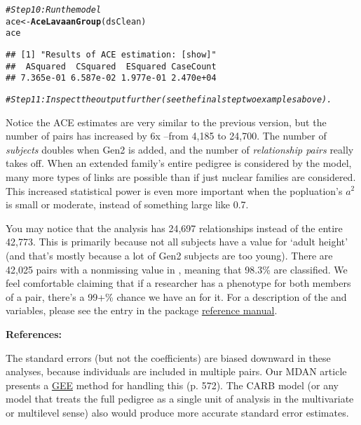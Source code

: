 \documentclass{article}\usepackage[]{graphicx}\usepackage[]{color}
\makeatletter
\newcommand{\hlcom}[1]{\textcolor[rgb]{0.678,0.584,0.686}{\textit{#1}}}%
\newcommand{\hlstd}[1]{\textcolor[rgb]{0.345,0.345,0.345}{#1}}%
\newcommand{\hlkwb}[1]{\textcolor[rgb]{0.69,0.353,0.396}{#1}}%
\newcommand{\hlkwd}[1]{\textcolor[rgb]{0.737,0.353,0.396}{\textbf{#1}}}%
\newenvironment{kframe}{%
 \def\at@end@of@kframe{}%
 \ifinner\ifhmode%
  \def\at@end@of@kframe{\end{minipage}}%
  \begin{minipage}{\columnwidth}%
 \fi\fi%
 \def\FrameCommand##1{\hskip\@totalleftmargin \hskip-\fboxsep
 \colorbox{shadecolor}{##1}\hskip-\fboxsep
     \hskip-\linewidth \hskip-\@totalleftmargin \hskip\columnwidth}%
 \MakeFramed {\advance\hsize-\width
   \@totalleftmargin\z@ \linewidth\hsize
   \@setminipage}}%
 {\par\unskip\endMakeFramed%
 \at@end@of@kframe}
\newenvironment{knitrout}{}{} %
\makeatother
\begin{document}
\begin{knitrout}
\begin{kframe}
\begin{alltt}
\hlcom{#Step 10: Run the model}
\hlstd{ace} \hlkwb{<-} \hlkwd{AceLavaanGroup}\hlstd{(dsClean)}
\hlstd{ace}
\end{alltt}
\begin{verbatim}
## [1] "Results of ACE estimation: [show]"
##  ASquared  CSquared  ESquared CaseCount 
## 7.365e-01 6.587e-02 1.977e-01 2.470e+04
\end{verbatim}
\begin{alltt}
\hlcom{#Step 11: Inspect the output further (see the final step two examples above).}
\end{alltt}
\end{kframe}
\end{knitrout}


Notice the ACE estimates are very similar to the previous version, but the number of pairs has increased by 6x --from 4,185 to 24,700.  The number of \emph{subjects} doubles when Gen2 is added, and the number of \emph{relationship pairs} really takes off.  When an extended family's entire pedigree is considered by the model, many more types of links are possible than if just nuclear families are considered.  This increased statistical power is even more important when the popluation's $a^2$ is small or moderate, instead of something large like 0.7.

You may notice that the analysis has 24,697 relationships instead of the entire 42,773.  This is primarily because not all subjects have a value for `adult height' (and that's mostly because a lot of Gen2 subjects are too young).  There are 42,025 pairs with a nonmissing value in , meaning that 98.3\% are classified.  We feel comfortable claiming that if a researcher has a phenotype for both members of a pair, there's a 99+\% chance we have an  for it.  For a description of the  and  variables, please see the  entry in the package \href{http://cran.r-project.org/web/packages/NlsyLinks/NlsyLinks.pdf}{reference manual}.

\textbf{References:}

The standard errors (but not the coefficients) are biased downward in these analyses, because individuals are included in multiple pairs.  Our MDAN article presents a \href{http://en.wikipedia.org/wiki/Generalized_estimating_equation}{GEE} method for handling this (p. 572).  The CARB model (or any model that treats the full pedigree as a single unit of analysis in the multivariate or multilevel sense) also would produce more accurate standard error estimates.
\end{document}
